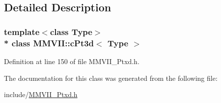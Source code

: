 \subsection{Detailed Description}
\subsubsection*{template$<$class Type$>$\\*
class M\+M\+V\+I\+I\+::c\+Pt3d$<$ Type $>$}



Definition at line 150 of file M\+M\+V\+I\+I\+\_\+\+Ptxd.\+h.



The documentation for this class was generated from the following file\+:\begin{DoxyCompactItemize}
\item 
include/\hyperlink{MMVII__Ptxd_8h}{M\+M\+V\+I\+I\+\_\+\+Ptxd.\+h}\end{DoxyCompactItemize}
